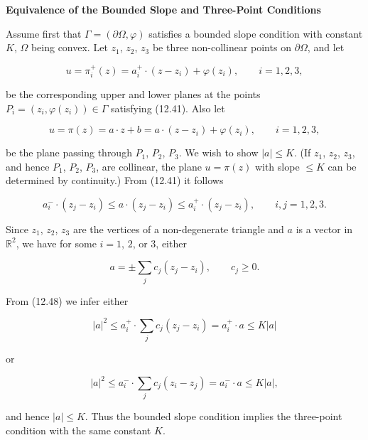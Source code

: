 \bigskip

\noindent\textbf{Equivalence of the Bounded Slope and Three-Point Conditions}

\medskip

Assume first that $\Gamma=(\partial\Omega, \varphi)$ satisfies a bounded slope condition with constant
$K$, $\Omega$ being convex. Let $z_1$, $z_2$, $z_3$ be three non-collinear points on $\partial\Omega$, and let

\[
u=\pi_i^+(z)=a_i^+ \cdot (z-z_i)+\varphi(z_i), \qquad i=1, 2, 3,
\]

be the corresponding upper and lower planes at the points $P_i=(z_i, \varphi(z_i)) \in \Gamma$
satisfying (12.41). Also let

\[
u=\pi(z)=a\cdot z+b=a\cdot (z-z_i)+\varphi(z_i), \qquad i=1, 2, 3,
\]

be the plane passing through $P_1$, $P_2$, $P_3$. We wish to show $|a| \le K$. (If $z_1$, $z_2$, $z_3$,
and hence $P_1$, $P_2$, $P_3$, are collinear, the plane $u=\pi(z)$ with slope $\le K$ can be determined by continuity.) From (12.41) it follows

\begin{equation}
\tag{12.48}
a_i^- \cdot (z_j-z_i)\le a\cdot (z_j-z_i)\le a_i^+ \cdot (z_j-z_i), \qquad i,j=1, 2, 3.
\end{equation}

Since $z_1$, $z_2$, $z_3$ are the vertices of a non-degenerate triangle and $a$ is a vector in
$\mathbb{R}^2$, we have for some $i=1$, $2$, or $3$, either

\[
a=\pm \sum_j c_j(z_j-z_i), \qquad c_j \ge 0.
\]

From (12.48) we infer either

\[
|a|^2 \le a_i^+ \cdot \sum_j c_j(z_j-z_i)=a_i^+ \cdot a \le K|a|
\]

or

\[
|a|^2 \le a_i^- \cdot \sum_j c_j(z_i-z_j)=a_i^- \cdot a \le K|a|,
\]

and hence $|a|\le K$. Thus the bounded slope condition implies the three-point condition
with the same constant $K$.



